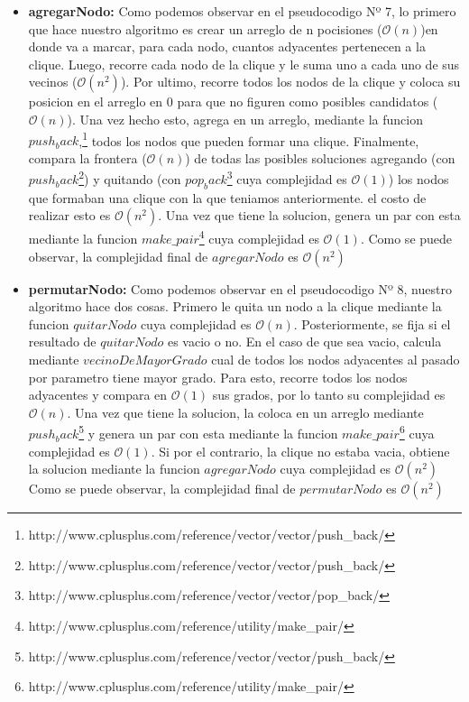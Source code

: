 \begin{itemize}
\item \textbf{agregarNodo:} \newline 
Como podemos observar en el pseudocodigo Nº 7, lo primero que hace nuestro algoritmo es crear un arreglo de n pocisiones ($\mathcal{O}(n)$)en donde va a marcar, para cada nodo, cuantos adyacentes pertenecen a la clique. Luego, recorre cada nodo de la clique y le suma uno a cada uno de sus vecinos ($\mathcal{O}(n^{2})$). Por ultimo, recorre todos los nodos de la clique y coloca su posicion en el arreglo en 0 para que no figuren como posibles candidatos ($\mathcal{O}(n)$). \newline
Una vez hecho esto, agrega en un arreglo, mediante la funcion $push_back$,\footnote{http://www.cplusplus.com/reference/vector/vector/push\_back/} todos los nodos que pueden formar una clique. Finalmente, compara la frontera ($\mathcal{O}(n)$) de todas las posibles soluciones agregando (con $push_back$\footnote{http://www.cplusplus.com/reference/vector/vector/push\_back/}) y quitando (con $pop_back$\footnote{http://www.cplusplus.com/reference/vector/vector/pop\_back/} cuya complejidad es $\mathcal{O}(1)$) los nodos que formaban una clique con la que teniamos anteriormente. el costo de realizar esto es $\mathcal{O}(n^{2})$. \newline
Una vez que tiene la solucion, genera un par con esta mediante la funcion $make\_pair$\footnote{http://www.cplusplus.com/reference/utility/make\_pair/} cuya complejidad es $\mathcal{O}(1)$.
\newline
Como se puede observar, la complejidad final de $agregarNodo$ es $\mathcal{O}(n^{2})$

\item \textbf{permutarNodo:} \newline 
Como podemos observar en el pseudocodigo Nº 8, nuestro algoritmo hace dos cosas. Primero le quita un nodo a la clique mediante la funcion $quitarNodo$ cuya complejidad es $\mathcal{O}(n)$. Posteriormente, se fija si el resultado de $quitarNodo$ es vacio o no. \newline
En el caso de que sea vacio, calcula mediante $vecinoDeMayorGrado$ cual de todos los nodos adyacentes al pasado por parametro tiene mayor grado. Para esto, recorre todos los nodos adyacentes y compara en $\mathcal{O}(1)$ sus grados, por lo tanto su complejidad es $\mathcal{O}(n)$. Una vez que tiene la solucion, la coloca en un arreglo mediante $push_back$\footnote{http://www.cplusplus.com/reference/vector/vector/push\_back/} y genera un par con esta mediante la funcion $make\_pair$\footnote{http://www.cplusplus.com/reference/utility/make\_pair/} cuya complejidad es $\mathcal{O}(1)$.
\newline
Si por el contrario, la clique no estaba vacia, obtiene la solucion mediante la funcion $agregarNodo$ cuya complejidad es $\mathcal{O}(n^{2})$
\newline
Como se puede observar, la complejidad final de $permutarNodo$ es $\mathcal{O}(n^{2})$


\end{itemize}
